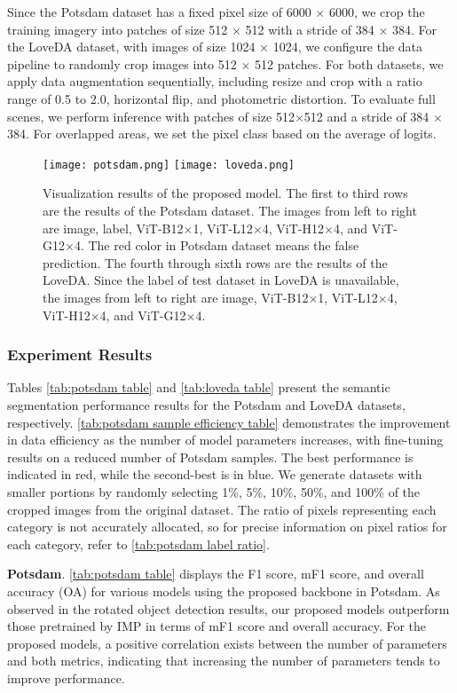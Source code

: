 Since the Potsdam dataset has a fixed pixel size of 6000 $\times$ 6000, we crop the training imagery into patches of size 512 $\times$ 512 with a stride of 384 $\times$ 384. For the LoveDA dataset, with images of size 1024 $\times$ 1024, we configure the data pipeline to randomly crop images into 512 $\times$ 512 patches. For both datasets, we apply data augmentation sequentially, including resize and crop with a ratio range of 0.5 to 2.0, horizontal flip, and photometric distortion. To evaluate full scenes, we perform inference with patches of size 512$\times$512 and a stride of 384 $\times$ 384. For overlapped areas, we set the pixel class based on the average of logits.

\begin{figure*}[p!tb]{}
    \centering
    \texttt{[image: potsdam.png]}
    \texttt{[image: loveda.png]}
    \caption{Visualization results of the proposed model. The first to third rows are the results of the Potsdam dataset. The images from left to right are image, label, ViT-B12$\times$1, ViT-L12$\times$4, ViT-H12$\times$4, and ViT-G12$\times$4. The red color in Potsdam dataset means the false prediction. The fourth through sixth rows are the results of the LoveDA. Since the label of test dataset in LoveDA is unavailable, the images from left to right are image, ViT-B12$\times$1, ViT-L12$\times$4, ViT-H12$\times$4, and ViT-G12$\times$4.}
    \label{fig:vis_semantic_seg}
\end{figure*}

\subsubsection{Experiment Results}
Tables \autoref{tab:potsdam table} and \autoref{tab:loveda table} present the semantic segmentation performance results for the Potsdam and LoveDA datasets, respectively. \autoref{tab:potsdam sample efficiency table} demonstrates the improvement in data efficiency as the number of model parameters increases, with fine-tuning results on a reduced number of Potsdam samples. The best performance is indicated in red, while the second-best is in blue. We generate datasets with smaller portions by randomly selecting 1\%, 5\%, 10\%, 50\%, and 100\% of the cropped images from the original dataset. The ratio of pixels representing each category is not accurately allocated, so for precise information on pixel ratios for each category, refer to \autoref{tab:potsdam label ratio}.

\textbf{Potsdam}. \autoref{tab:potsdam table} displays the F1 score, mF1 score, and overall accuracy (OA) for various models using the proposed backbone in Potsdam. As observed in the rotated object detection results, our proposed models outperform those pretrained by IMP in terms of mF1 score and overall accuracy. For the proposed models, a positive correlation exists between the number of parameters and both metrics, indicating that increasing the number of parameters tends to improve performance.

